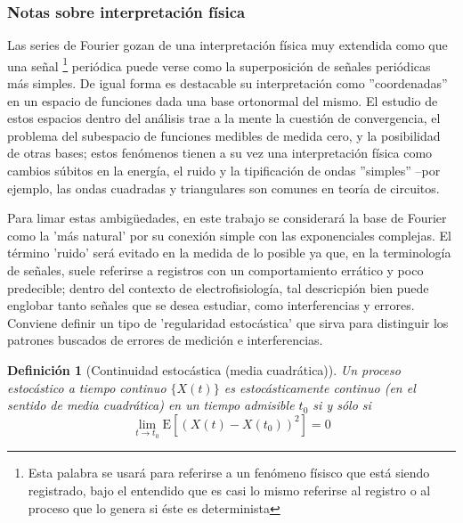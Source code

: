 \documentclass[12pt,a4paper]{mitthesis}
\newtheorem{defn}{Definici\'on}
\newcommand{\E}[1]{\mathrm{E}\left[ #1 \right]}
\begin{document}

\subsubsection{Notas sobre interpretaci\'on f\'isica}

Las series de Fourier gozan de una interpretación física muy extendida como que una se\~nal
\footnote{Esta palabra se usar\'a para referirse a un fen\'omeno f\'isisco que est\'a siendo 
registrado, bajo el entendido que es casi lo mismo referirse al registro o al proceso que lo genera 
si \'este es determinista} peri\'odica puede verse como la superposici\'on de se\~nales 
peri\'odicas m\'as simples. 
De igual forma es destacable su interpretaci\'on como ''coordenadas'' en un espacio de funciones
dada una base ortonormal del mismo. 
El estudio de estos espacios dentro del an\'alisis trae a la mente la cuesti\'on de convergencia,
el problema del subespacio de funciones medibles de medida cero, y la posibilidad de otras bases; 
estos fen\'omenos tienen a su  vez una interpretaci\'on f\'isica como cambios s\'ubitos en la 
energ\'ia, el ruido y la tipificaci\'on de ondas ''simples'' --por ejemplo, las ondas cuadradas y 
triangulares son comunes en teor\'ia de circuitos.

Para limar estas ambig\"uedades, en este trabajo se considerar\'a la base de Fourier como la 'm\'as 
natural' por su conexi\'on simple con las exponenciales complejas. El t\'ermino 'ruido' ser\'a 
evitado en la medida de lo posible ya que, en la terminolog\'ia de se\~nales, suele referirse a 
registros con un comportamiento err\'atico y poco predecible; dentro del contexto de 
electrofisiolog\'ia, tal descricpi\'on bien puede englobar tanto se\~nales que se desea estudiar, 
como interferencias y errores.
Conviene definir un tipo de 'regularidad estoc\'astica' que sirva para distinguir los patrones 
buscados de errores de medici\'on e interferencias.

\begin{defn}[Continuidad estoc\'astica (media cuadr\'atica)]
Un proceso estoc\'astico a tiempo continuo $\{ X(t) \}$ es estoc\'asticamente continuo (en el 
sentido de media cuadr\'atica) en un tiempo admisible $t_0$ si y s\'olo si
\begin{equation*}
\lim_{t \rightarrow t_0} \E{\left( X(t) - X(t_0) \right)^{2}} = 0
\end{equation*}
\label{cont_est}
\end{defn}
\end{document}
